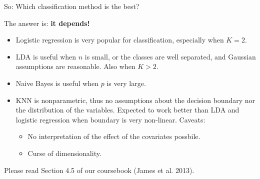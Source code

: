 \documentclass[
  10pt,
  ignorenonframetext,
]{beamer}
\providecommand{\tightlist}{%
  \setlength{\itemsep}{0pt}\setlength{\parskip}{0pt}}
\begin{document}
\begin{frame}
\begin{block}{So: Which classification method is the best?}
\protect\hypertarget{so-which-classification-method-is-the-best}{}
\(~\)

The answer is: \textbf{it depends!}

\vspace{2mm}

\begin{itemize}
\tightlist
\item
  Logistic regression is very popular for classification, especially
  when \(K = 2\).
\end{itemize}

\vspace{2mm}

\begin{itemize}
\tightlist
\item
  LDA is useful when \(n\) is small, or the classes are well separated,
  and Gaussian assumptions are reasonable. Also when \(K > 2\).
\end{itemize}

\vspace{2mm}

\begin{itemize}
\tightlist
\item
  Naive Bayes is useful when \(p\) is very large.
\end{itemize}

\vspace{2mm}

\begin{itemize}
\tightlist
\item
  KNN is nonparametric, thus no assumptions about the decision boundary
  nor the distribution of the variables. Expected to work better than
  LDA and logistic regression when boundary is very non-linear. Caveats:

  \begin{itemize}
  \tightlist
  \item
    No interpretation of the effect of the covariates possbile.
  \item
    Curse of dimensionality.
  \end{itemize}
\end{itemize}

\vspace{2mm}

Please read Section 4.5 of our coursebook (James et al. 2013).
\end{block}
\end{frame}
\end{document}
